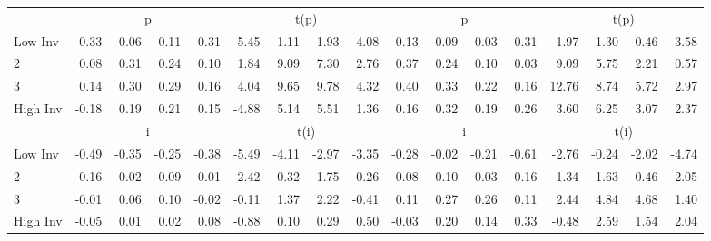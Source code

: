 \begin{table}[!ht]
\begin{tabular}{lrrrrrrrrrrrrrrrr}
  
    
      & \multicolumn{4}{c}{p} & \multicolumn{4}{c}{t(p)}
    
      & \multicolumn{4}{c}{p} & \multicolumn{4}{c}{t(p)}
    
    \\
      \cmidrule(r){2-5} \cmidrule(r){6-9} \cmidrule(r){10-13} \cmidrule(r){14-17}

    Low Inv   & -0.33  & -0.06  & -0.11  & -0.31  & -5.45  & -1.11  & -1.93  & -4.08  & 0.13  & 0.09  & -0.03  & -0.31  & 1.97  & 1.30  & -0.46  & -3.58  \\
           2  & 0.08  & 0.31  & 0.24  & 0.10  & 1.84  & 9.09  & 7.30  & 2.76  & 0.37  & 0.24  & 0.10  & 0.03  & 9.09  & 5.75  & 2.21  & 0.57  \\
           3  & 0.14  & 0.30  & 0.29  & 0.16  & 4.04  & 9.65  & 9.78  & 4.32  & 0.40  & 0.33  & 0.22  & 0.16  & 12.76  & 8.74  & 5.72  & 2.97  \\
    High Inv  & -0.18  & 0.19  & 0.21  & 0.15  & -4.88  & 5.14  & 5.51  & 1.36  & 0.16  & 0.32  & 0.19  & 0.26  & 3.60  & 6.25  & 3.07  & 2.37  \\

  
    
      & \multicolumn{4}{c}{i} & \multicolumn{4}{c}{t(i)}
    
      & \multicolumn{4}{c}{i} & \multicolumn{4}{c}{t(i)}
    
    \\
      \cmidrule(r){2-5} \cmidrule(r){6-9} \cmidrule(r){10-13} \cmidrule(r){14-17}

    Low Inv   & -0.49  & -0.35  & -0.25  & -0.38  & -5.49  & -4.11  & -2.97  & -3.35  & -0.28  & -0.02  & -0.21  & -0.61  & -2.76  & -0.24  & -2.02  & -4.74  \\
           2  & -0.16  & -0.02  & 0.09  & -0.01  & -2.42  & -0.32  & 1.75  & -0.26  & 0.08  & 0.10  & -0.03  & -0.16  & 1.34  & 1.63  & -0.46  & -2.05  \\
           3  & -0.01  & 0.06  & 0.10  & -0.02  & -0.11  & 1.37  & 2.22  & -0.41  & 0.11  & 0.27  & 0.26  & 0.11  & 2.44  & 4.84  & 4.68  & 1.40  \\
    High Inv  & -0.05  & 0.01  & 0.02  & 0.08  & -0.88  & 0.10  & 0.29  & 0.50  & -0.03  & 0.20  & 0.14  & 0.33  & -0.48  & 2.59  & 1.54  & 2.04  \\

  

  \bottomrule
\end{tabular}
\label{tbl:32_Size_BM_Prior_FF2015}
\end{table}
